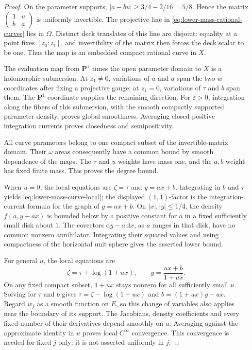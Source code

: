 \begin{proof}
On the parameter supports, $|a-bu|\geq3/4-2/16=5/8$. Hence the matrix
$\left(\begin{smallmatrix}1&u\\ b&a\end{smallmatrix}\right)$ is uniformly invertible. The projective line in \eqref{eq:lower-mass-rational-curves} lies in $\Omega$. Distinct deck translates of this line are disjoint: equality at a point fixes $[z_0:z_1]$, and invertibility of the matrix then forces the deck scalar to be one. Thus the map is an embedded compact rational curve in $X$.

The evaluation map from $\mathbf P^1$ times the open parameter domain to $X$ is a holomorphic submersion. At $z_1\ne0$, variations of $u$ and $a$ span the two $w$ coordinates after fixing a projective gauge; at $z_1=0$, variations of $\tau$ and $b$ span them. The $\mathbf P^1$ coordinate supplies the remaining direction. For $\varepsilon>0$, integration along the fibers of this submersion, with the smooth compactly supported parameter density, proves global smoothness. Averaging closed positive integration currents proves closedness and semipositivity.

All curve parameters belong to one compact subset of the invertible-matrix domain. Their $\omega$ areas consequently have a common bound by smooth dependence of the maps. The $\tau$ and $u$ weights have mass one, and the $a,b$ weight has fixed finite mass. This proves the degree bound.

When $u=0$, the local equations are $\zeta=\tau$ and $y=ax+b$. Integrating in $b$ and $\tau$ yields \eqref{eq:lower-mass-curve-local}; the displayed $(1,1)$-factor is the integration-current formula for the graph of $y=ax+b$. On $|x|,|y|\leq1/4$, the density $f(a,y-ax)$ is bounded below by a positive constant for $a$ in a fixed sufficiently small disk about $1$. The covectors $\mathrm{d}y-a\,\mathrm{d}x$, as $a$ ranges in that disk, have no common nonzero annihilator. Integrating their squared values and using compactness of the horizontal unit sphere gives the asserted lower bound.

For general $u$, the local equations are
\[
 \zeta=\tau+\log(1+ux),\qquad y=\frac{ax+b}{1+ux}.
\]
On any fixed compact subset, $1+ux$ stays nonzero for all sufficiently small $u$. Solving for $\tau$ and $b$ gives
$\tau=\zeta-\log(1+ux)$ and $b=(1+ux)y-ax$. Regard $w_j$ as a smooth function on $E$, so this change of variables also applies near the boundary of its support. The Jacobians, density coefficients and every fixed number of their derivatives depend smoothly on $u$. Averaging against the approximate identity in $u$ proves local $C^\infty$ convergence. This convergence is needed for fixed $j$ only; it is not asserted uniformly in $j$.
\end{proof}

